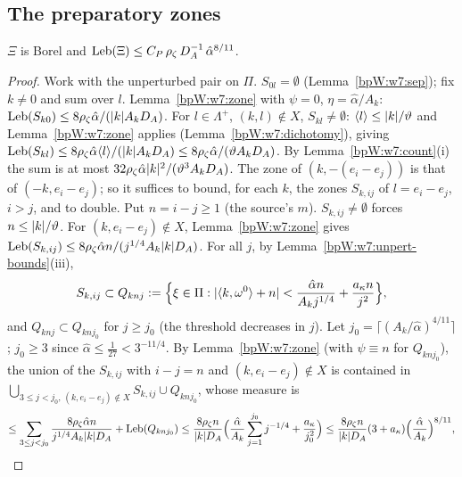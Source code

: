 \subsection{The preparatory zones}\label{bpW:w7:prep-sec}

\begin{proposition}\label{bpW:w7:prep}
$\Xi$ is Borel and $\operatorname{Leb}(\Xi)\le C_P\,\rho_\zeta\,D_A^{-1}\,\hat\alpha^{8/11}$.
\end{proposition}
\begin{proof}
Work with the unperturbed pair on $\Pi$. $S_{0l}=\emptyset$ (Lemma~\ref{bpW:w7:sep}); fix $k\ne0$ and sum over $l$.
\label{stepW:w7:prep-0}
Lemma~\ref{bpW:w7:zone} with $\psi=0$, $\eta=\hat\alpha/A_k$: $\operatorname{Leb}(S_{k0})\le8\rho_\zeta\hat\alpha/(\lvert k\rvert A_kD_A)$.
\proofstep{$\Lambda^+$}\label{stepW:w7:prep-plus}
For $l\in\Lambda^+$, $(k,l)\notin X$, $S_{kl}\ne\emptyset$: $\langle l\rangle\le\lvert k\rvert/\vartheta$ and Lemma~\ref{bpW:w7:zone}
applies (Lemma~\ref{bpW:w7:dichotomy}), giving $\operatorname{Leb}(S_{kl})\le8\rho_\zeta\hat\alpha\langle l\rangle/(\lvert k\rvert A_kD_A)\le
8\rho_\zeta\hat\alpha/(\vartheta A_kD_A)$. By Lemma~\ref{bpW:w7:count}(i) the sum is at most
$32\rho_\zeta\hat\alpha\lvert k\rvert^2/(\vartheta^3A_kD_A)$.
\label{stepW:w7:prep-minus-group}
The zone of $(k,-(e_i-e_j))$ is that of $(-k,e_i-e_j)$; so it suffices to bound, for each $k$, the zones
$S_{k,ij}$ of $l=e_i-e_j$, $i>j$, and to double. Put $n=i-j\ge1$ (the source's $m$). $S_{k,ij}\neq\emptyset$ forces
$n\le\lvert k\rvert/\vartheta$. For $(k,e_i-e_j)\notin X$, Lemma~\ref{bpW:w7:zone} gives
$\operatorname{Leb}(S_{k,ij})\le8\rho_\zeta\hat\alpha n/(j^{1/4}A_k\lvert k\rvert D_A)$. For all $j$, by
Lemma~\ref{bpW:w7:unpert-bounds}(iii),
\[S_{k,ij}\subset Q_{knj}:=\Bigl\{\xi\in\Pi:\lvert \langle k,\omega^0\rangle+n\rvert<\frac{\hat\alpha n}{A_kj^{1/4}}+\frac{a_\kappa n}{j^2}\Bigr\},\]
and $Q_{knj}\subset Q_{knj_0}$ for $j\ge j_0$ (the threshold decreases in $j$).
\label{stepW:w7:prep-j0}
Let $j_0=\lceil(A_k/\hat\alpha)^{4/11}\rceil$; $j_0\ge3$ since $\hat\alpha\le\frac1{27}<3^{-11/4}$. By
Lemma~\ref{bpW:w7:zone} (with $\psi\equiv n$ for $Q_{knj_0}$),
the union of the $S_{k,ij}$ with $i-j=n$ and $(k,e_i-e_j)\notin X$ is contained in
$\bigcup_{3\le j<j_0,\,(k,e_i-e_j)\notin X}S_{k,ij}\cup Q_{knj_0}$, whose measure is
\[\le\sum_{3\le j<j_0}\frac{8\rho_\zeta\hat\alpha n}{j^{1/4}A_k\lvert k\rvert D_A}+\operatorname{Leb}(Q_{knj_0})
\le\frac{8\rho_\zeta n}{\lvert k\rvert D_A}\Bigl(\frac{\hat\alpha}{A_k}\sum_{j=1}^{j_0}j^{-1/4}+\frac{a_\kappa}{j_0^2}\Bigr)
\le\frac{8\rho_\zeta n}{\lvert k\rvert D_A}(3+a_\kappa)\Bigl(\frac{\hat\alpha}{A_k}\Bigr)^{8/11},\]

\end{proof}
